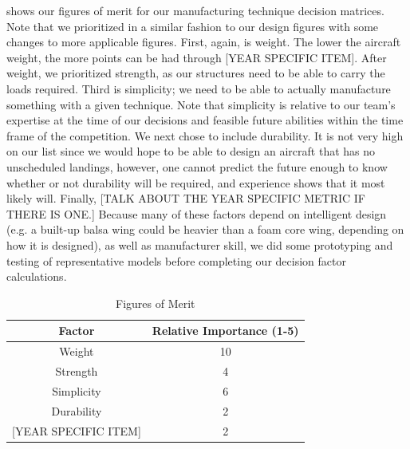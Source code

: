 \documentclass[report]{byu-aero}
\begin{document}
 shows our figures of merit for our manufacturing technique decision matrices.  Note that we prioritized in a similar fashion to our design figures with some changes to more applicable figures.  First, again, is weight.  The lower the aircraft weight, the more points can be had through {\color{\BYUred} {\color{BYUred} [YEAR SPECIFIC ITEM]}}.  After weight, we prioritized strength, as our structures need to be able to carry the loads required.  Third is simplicity; we need to be able to actually manufacture something with a given technique.  Note that simplicity is relative to our team's expertise at the time of our decisions and feasible future abilities within the time frame of the competition.  We next chose to include durability.  It is not very high on our list since we would hope to be able to design an aircraft that has no unscheduled landings, however, one cannot predict the future enough to know whether or not durability will be required, and experience shows that it most likely will.  Finally, {\color{\BYUred}[TALK ABOUT THE YEAR SPECIFIC METRIC IF THERE IS ONE.]} Because many of these factors depend on intelligent design (e.g. a built-up balsa wing could be heavier than a foam core wing, depending on how it is designed), as well as manufacturer skill, we did some prototyping and testing of representative models before completing our decision factor calculations.


\begin{table}[h!]
	\centering
	\caption{Figures of Merit}
	\label{tab:fomman}
	\begin{tabular}{ |c|c| } 
		\hline
		\rowcolor{BYUbluemid}
		Factor & Relative Importance (1-5) \\
		\hline
		Weight & 10 \\
		\hline
		Strength & 4 \\
		\hline
		Simplicity & 6 \\
		\hline
		Durability & 2 \\
		\hline
		{\color{\BYUred} {\color{BYUred} [YEAR SPECIFIC ITEM]}} & 2 \\
		\hline
	\end{tabular}
\end{table}
\end{document}
